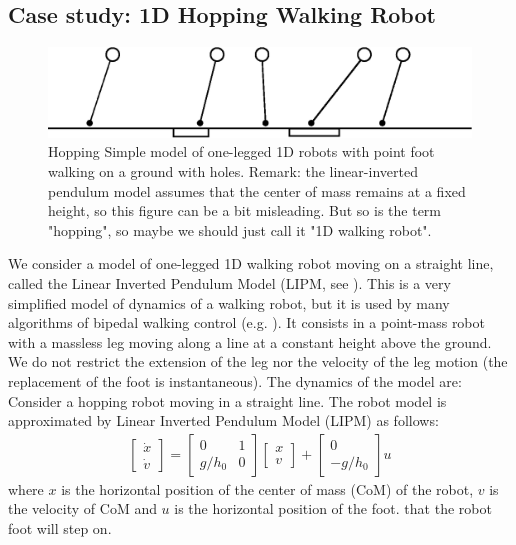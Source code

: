 \subsection{Case study: 1D Hopping {\color{purple} Walking} Robot}

\begin{figure}
	\centering
	\includegraphics[width=0.8\linewidth]{pic/hop_rob}
	\caption{Hopping {\color{purple} Simple model of one-legged 1D} robots with point foot {\color{purple} walking} on a ground with holes. {\color{purple} Remark: the linear-inverted pendulum model assumes that the center of mass remains at a fixed height, so this figure can be a bit misleading. But so is the term "hopping", 
    so maybe we should just call it "1D walking robot".}}
	\label{fig:hoprob}
\end{figure}

{\color{purple} We consider a model of one-legged 1D walking robot moving on a straight line, called the Linear Inverted Pendulum Model (LIPM, see \cite{kajita20013d}). This is a very simplified model of dynamics of a walking robot, but it is used by many algorithms of bipedal walking control (e.g. \cite{englsberger2011bipedal}). It consists in a point-mass robot with a massless leg moving along a line at a constant height above the ground. We do not restrict the extension of the leg nor the velocity of the leg motion (the replacement of the foot is instantaneous). The dynamics of the model are: }
Consider a hopping robot moving in a straight line. The robot model is approximated by  Linear Inverted Pendulum Model (LIPM) as follows:
\begin{align}
\begin{bmatrix}
\dot{x}\\
\dot{v}
\end{bmatrix} = \begin{bmatrix}
0 & 1\\
g/h_0 & 0
\end{bmatrix}\begin{bmatrix}
x\\
v
\end{bmatrix}+\begin{bmatrix}
0\\-g/h_0
\end{bmatrix} u \label{eqn: model}
\end{align}
where $x$ is the {\color{purple} horizontal position of the} center of mass (CoM) of the robot, $v$ is the velocity of CoM and $ u $ is {\color{purple} the horizontal position of the foot.} that the robot foot will step on. 

